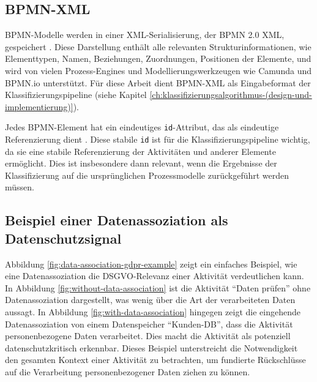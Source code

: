 \subsection*{\ac{BPMN}-XML}

\ac{BPMN}-Modelle werden in einer XML-Serialisierung, der \ac{BPMN} 2.0 XML, gespeichert \cite{omgbpmn}. Diese Darstellung enthält alle relevanten Strukturinformationen, wie Elementtypen, Namen, Beziehungen, Zuordnungen, Positionen der Elemente, und wird von vielen Prozess-Engines und Modellierungswerkzeugen wie Camunda \cite{camunda} und BPMN.io \cite{bpmnio} unterstützt. Für diese Arbeit dient \ac{BPMN}-XML als Eingabeformat der Klassifizierungspipeline (siehe Kapitel \ref{ch:klassifizierungsalgorithmus-(design-und-implementierung)}).

Jedes \ac{BPMN}-Element hat ein eindeutiges \texttt{id}-Attribut, das als eindeutige Referenzierung dient \cite{omgbpmn}. Diese stabile \texttt{id} ist für die Klassifizierungspipeline wichtig, da sie eine stabile Referenzierung der Aktivitäten und anderer Elemente ermöglicht. Dies ist insbesondere dann relevant, wenn die Ergebnisse der Klassifizierung auf die ursprünglichen Prozessmodelle zurückgeführt werden müssen.

\subsection*{Beispiel einer Datenassoziation als Datenschutzsignal}

Abbildung \ref{fig:data-association-gdpr-example} zeigt ein einfaches Beispiel, wie eine Datenassoziation die \ac{DSGVO}-Relevanz einer Aktivität verdeutlichen kann. In Abbildung \ref{fig:without-data-association} ist die Aktivität \enquote{Daten prüfen} ohne Datenassoziation dargestellt, was wenig über die Art der verarbeiteten Daten aussagt. In Abbildung \ref{fig:with-data-association} hingegen zeigt die eingehende Datenassoziation von einem Datenspeicher \enquote{Kunden-DB}, dass die Aktivität personenbezogene Daten verarbeitet. Dies macht die Aktivität als potenziell datenschutzkritisch erkennbar. Dieses Beispiel unterstreicht die Notwendigkeit den gesamten Kontext einer Aktivität zu betrachten, um fundierte Rückschlüsse auf die Verarbeitung personenbezogener Daten ziehen zu können.

